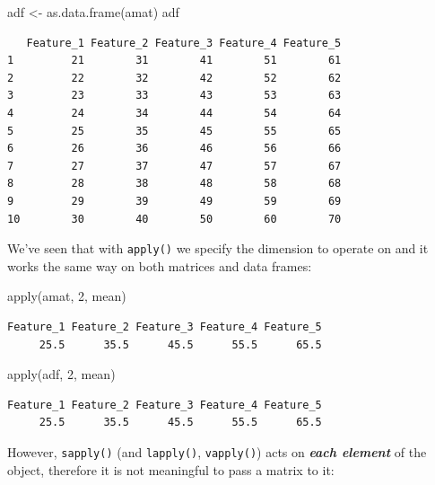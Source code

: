 \documentclass[
]{book}
\newenvironment{Shaded}{\begin{snugshade}}{\end{snugshade}}
\newcommand{\DecValTok}[1]{\textcolor[rgb]{0.00,0.00,0.81}{#1}}
\newcommand{\FunctionTok}[1]{\textcolor[rgb]{0.00,0.00,0.00}{#1}}
\newcommand{\NormalTok}[1]{#1}
\newcommand{\OtherTok}[1]{\textcolor[rgb]{0.56,0.35,0.01}{#1}}
\begin{document}
\begin{Shaded}
\begin{Highlighting}[]
\NormalTok{adf }\OtherTok{\textless{}{-}} \FunctionTok{as.data.frame}\NormalTok{(amat)}
\NormalTok{adf}
\end{Highlighting}
\end{Shaded}

\begin{verbatim}
   Feature_1 Feature_2 Feature_3 Feature_4 Feature_5
1         21        31        41        51        61
2         22        32        42        52        62
3         23        33        43        53        63
4         24        34        44        54        64
5         25        35        45        55        65
6         26        36        46        56        66
7         27        37        47        57        67
8         28        38        48        58        68
9         29        39        49        59        69
10        30        40        50        60        70
\end{verbatim}

We've seen that with \texttt{apply()} we specify the dimension to operate on and it works the same way on both matrices and data frames:

\begin{Shaded}
\begin{Highlighting}[]
\FunctionTok{apply}\NormalTok{(amat, }\DecValTok{2}\NormalTok{, mean)}
\end{Highlighting}
\end{Shaded}

\begin{verbatim}
Feature_1 Feature_2 Feature_3 Feature_4 Feature_5 
     25.5      35.5      45.5      55.5      65.5 
\end{verbatim}

\begin{Shaded}
\begin{Highlighting}[]
\FunctionTok{apply}\NormalTok{(adf, }\DecValTok{2}\NormalTok{, mean)}
\end{Highlighting}
\end{Shaded}

\begin{verbatim}
Feature_1 Feature_2 Feature_3 Feature_4 Feature_5 
     25.5      35.5      45.5      55.5      65.5 
\end{verbatim}

However, \texttt{sapply()} (and \texttt{lapply()}, \texttt{vapply()}) acts on \textbf{\emph{each element}} of the object, therefore it is not meaningful to pass a matrix to it:
\end{document}
